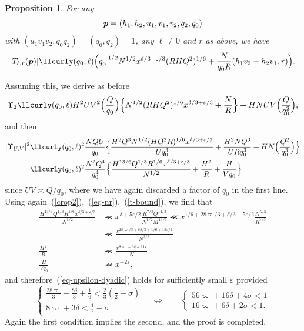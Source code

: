 \documentclass[12pt,a4paper,reqno]{amsart}
\numberwithin{equation}{section}
\theoremstyle{plain}
\newtheorem{proposition}[theorem]{Proposition}
\theoremstyle{definition}
\newcommand\eps{\varepsilon}
\newcommand{\uple}[1]{\text{\boldmath${#1}$}}
\renewcommand{\sim}{\asymp}
\renewcommand{\lessapprox}{\llcurly}
\begin{document}
\begin{proposition}
\label{exse-3}  
For any
$$
\uple{p}=(h_1,h_2,u_1,v_1,v_2,q_2,q_0)
$$
with $(u_1v_1v_2,q_0q_2)=(q_0,q_2)=1$, any $\ell \neq 0$ and $r$
as above, we have
$$
|T_{\ell,r}( \uple{p})| \lessapprox (q_0,\ell)\Bigl(q_0^{-1/2} N^{1/2}
x^{\delta/3+\eps/3} (R H Q^2)^{1/6} + \frac{N}{q_0R}(h_1 v_2-h_2v_1,
r)\Bigr).
$$
\end{proposition}

Assuming this, we derive as before 
$$
\Upsilon_2\lessapprox  (q_0,\ell) 
H^2UV^2\Bigl(\frac{Q}{q_0}\Bigr)
\Bigl\{
N^{1/2}(RHQ^2)^{1/6}x^{\delta/3+\eps/3}+\frac{N}{R}
\Bigr\}
+HNUV\Bigl(\frac{Q}{q_0^2}\Bigr),
$$
and then
\begin{align*}
  |\Upsilon_{U,V}|^2&\lessapprox (q_0,\ell)^2\frac{NQU}{q_0} \Bigl\{
  \frac{H^2Q^3N^{1/2}(HQ^2R)^{1/6}x^{\delta/3+\eps/3}}{Uq_0^3}
  +\frac{H^2NQ^3}{URq_0^3} +HN\Bigl(\frac{Q^2}{q_0^3}\Bigr)
  \Bigr\}\\
  &\lessapprox (q_0,\ell)^2\frac{N^2Q^4}{q_0^4} \Bigl\{
  \frac{H^{13/6}Q^{1/3}R^{1/6}x^{\delta/3+\eps/3}}{N^{1/2}} +\frac{H^2}{R}+
  \frac{H}{Vq_0} \Bigr\}
\end{align*}
since $UV\sim Q/q_0$, where we have again discarded a factor of $q_0$ in the first line.  Using
again~(\ref{crop2}),~(\ref{eq-nr}),~(\ref{t-bound}), we find that
\begin{align*}
  \frac{H^{13/6}Q^{1/3}R^{1/6}x^{\delta/3+\eps/3}}{N^{1/2}} &\lessapprox
  x^{\delta+5\eps/2}\frac{R^{7/3}Q^{14/3}}{N^{1/2}M^{13/6}}
  \lessapprox
  x^{1/6+28\varpi/3+\delta/3+5\eps/2}\frac{N^{5/3}}{R^{7/3}}\\
  & \lessapprox
  \frac{x^{28\varpi/3+8\delta/3+1/6+19\eps/2}}{N^{2/3}}
  \\
  \frac{H^2}{R}&\lessapprox \frac{x^{8\varpi +3\delta+11\eps}}{N}\\
  \frac{H}{Vq_0}&\lessapprox x^{-2\eps},
\end{align*}
and therefore~(\ref{eq-upsilon-dyadic}) holds for sufficiently small $\eps$ provided
$$
\begin{cases}
  \frac{28\varpi}{3}+\frac{8\delta}{3}+\frac{1}{6}
  <\frac{2}{3}\left(\frac{1}{2}-\sigma\right)
  \\
  8\varpi+3\delta<\frac{1}{2}-\sigma
\end{cases}\quad
\Leftrightarrow
\quad\quad
\begin{cases}
  56\varpi+16\delta+4\sigma <1
  \\
  16\varpi+6\delta+2\sigma<1.
\end{cases}
$$
Again the first condition implies the second, and the proof is
completed.
\end{document}
